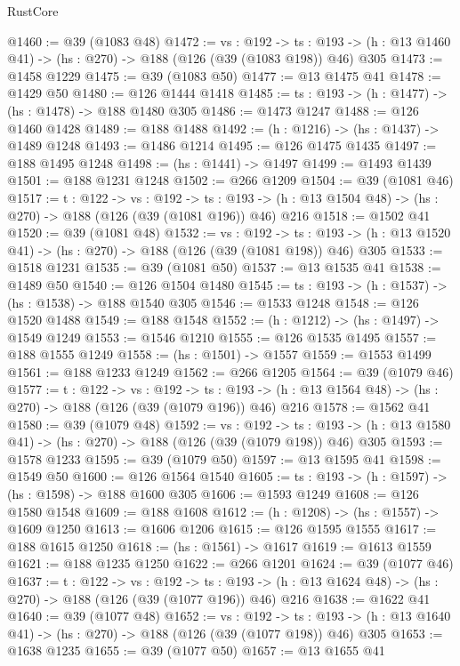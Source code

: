 \begin{lexlean}{RustCore}
\begin{coremodule}
@1460 := @39 (@1083 @48)
@1472 := {vs : @192} ->
  {ts : @193} -> (h : @13 @1460 @41) -> (hs : @270) -> @188 (@126 (@39 (@1083 @198)) @46) @305
@1473 := @1458 @1229
@1475 := @39 (@1083 @50)
@1477 := @13 @1475 @41
@1478 := @1429 @50
@1480 := @126 @1444 @1418
@1485 := {ts : @193} -> (h : @1477) -> (hs : @1478) -> @188 @1480 @305
@1486 := @1473 @1247
@1488 := @126 @1460 @1428
@1489 := @188 @1488
@1492 := (h : @1216) -> (hs : @1437) -> @1489 @1248
@1493 := @1486 @1214
@1495 := @126 @1475 @1435
@1497 := @188 @1495 @1248
@1498 := (hs : @1441) -> @1497
@1499 := @1493 @1439
@1501 := @188 @1231 @1248
@1502 := @266 @1209
@1504 := @39 (@1081 @46)
@1517 := {t : @122} ->
  {vs : @192} ->
  {ts : @193} -> (h : @13 @1504 @48) -> (hs : @270) -> @188 (@126 (@39 (@1081 @196)) @46) @216
@1518 := @1502 @41
@1520 := @39 (@1081 @48)
@1532 := {vs : @192} ->
  {ts : @193} -> (h : @13 @1520 @41) -> (hs : @270) -> @188 (@126 (@39 (@1081 @198)) @46) @305
@1533 := @1518 @1231
@1535 := @39 (@1081 @50)
@1537 := @13 @1535 @41
@1538 := @1489 @50
@1540 := @126 @1504 @1480
@1545 := {ts : @193} -> (h : @1537) -> (hs : @1538) -> @188 @1540 @305
@1546 := @1533 @1248
@1548 := @126 @1520 @1488
@1549 := @188 @1548
@1552 := (h : @1212) -> (hs : @1497) -> @1549 @1249
@1553 := @1546 @1210
@1555 := @126 @1535 @1495
@1557 := @188 @1555 @1249
@1558 := (hs : @1501) -> @1557
@1559 := @1553 @1499
@1561 := @188 @1233 @1249
@1562 := @266 @1205
@1564 := @39 (@1079 @46)
@1577 := {t : @122} ->
  {vs : @192} ->
  {ts : @193} -> (h : @13 @1564 @48) -> (hs : @270) -> @188 (@126 (@39 (@1079 @196)) @46) @216
@1578 := @1562 @41
@1580 := @39 (@1079 @48)
@1592 := {vs : @192} ->
  {ts : @193} -> (h : @13 @1580 @41) -> (hs : @270) -> @188 (@126 (@39 (@1079 @198)) @46) @305
@1593 := @1578 @1233
@1595 := @39 (@1079 @50)
@1597 := @13 @1595 @41
@1598 := @1549 @50
@1600 := @126 @1564 @1540
@1605 := {ts : @193} -> (h : @1597) -> (hs : @1598) -> @188 @1600 @305
@1606 := @1593 @1249
@1608 := @126 @1580 @1548
@1609 := @188 @1608
@1612 := (h : @1208) -> (hs : @1557) -> @1609 @1250
@1613 := @1606 @1206
@1615 := @126 @1595 @1555
@1617 := @188 @1615 @1250
@1618 := (hs : @1561) -> @1617
@1619 := @1613 @1559
@1621 := @188 @1235 @1250
@1622 := @266 @1201
@1624 := @39 (@1077 @46)
@1637 := {t : @122} ->
  {vs : @192} ->
  {ts : @193} -> (h : @13 @1624 @48) -> (hs : @270) -> @188 (@126 (@39 (@1077 @196)) @46) @216
@1638 := @1622 @41
@1640 := @39 (@1077 @48)
@1652 := {vs : @192} ->
  {ts : @193} -> (h : @13 @1640 @41) -> (hs : @270) -> @188 (@126 (@39 (@1077 @198)) @46) @305
@1653 := @1638 @1235
@1655 := @39 (@1077 @50)
@1657 := @13 @1655 @41

\end{coremodule}
\end{lexlean}

